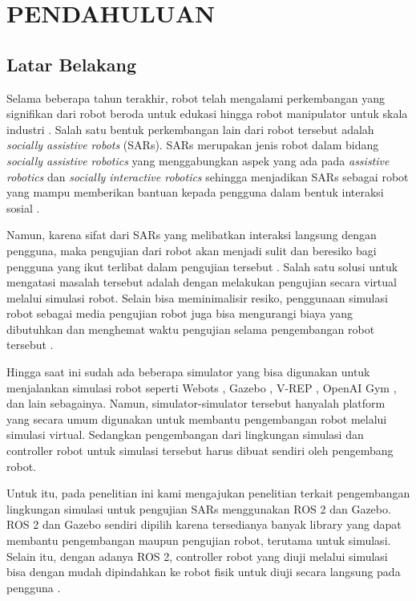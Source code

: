 \section{PENDAHULUAN}

\subsection{Latar Belakang}

Selama beberapa tahun terakhir, robot telah mengalami perkembangan yang signifikan dari robot beroda untuk edukasi \citep{Goncalves2009} hingga robot manipulator untuk skala industri \citep{Blatnicky2020}.
Salah satu bentuk perkembangan lain dari robot tersebut adalah \emph{socially assistive robots} (SARs).
SARs merupakan jenis robot dalam bidang \emph{socially assistive robotics} yang menggabungkan aspek yang ada pada \emph{assistive robotics} dan \emph{socially interactive robotics} sehingga menjadikan SARs sebagai robot yang mampu memberikan bantuan kepada pengguna dalam bentuk interaksi sosial \citep{Seifer2005}.

Namun, karena sifat dari SARs yang melibatkan interaksi langsung dengan pengguna, maka pengujian dari robot akan menjadi sulit dan beresiko bagi pengguna yang ikut terlibat dalam pengujian tersebut \citep{Erickson2020}.
Salah satu solusi untuk mengatasi masalah tersebut adalah dengan melakukan pengujian secara virtual melalui simulasi robot.
Selain bisa meminimalisir resiko, penggunaan simulasi robot sebagai media pengujian robot juga bisa mengurangi biaya yang dibutuhkan dan menghemat waktu pengujian selama pengembangan robot tersebut \citep{Takaya2016}.

Hingga saat ini sudah ada beberapa simulator yang bisa digunakan untuk menjalankan simulasi robot seperti Webots \citep{Michel2004}, Gazebo \citep{Koenig2004}, V-REP \citep{Rohmer2013}, OpenAI Gym \citep{Brockman2016}, dan lain sebagainya.
Namun, simulator-simulator tersebut hanyalah platform yang secara umum digunakan untuk membantu pengembangan robot melalui simulasi virtual.
Sedangkan pengembangan dari lingkungan simulasi dan controller robot untuk simulasi tersebut harus dibuat sendiri oleh pengembang robot.

Untuk itu, pada penelitian ini kami mengajukan penelitian terkait pengembangan lingkungan simulasi untuk pengujian SARs menggunakan ROS 2 dan Gazebo.
ROS 2 dan Gazebo sendiri dipilih karena tersedianya banyak library yang dapat membantu pengembangan maupun pengujian robot, terutama untuk simulasi.
Selain itu, dengan adanya ROS 2, controller robot yang diuji melalui simulasi bisa dengan mudah dipindahkan ke robot fisik untuk diuji secara langsung pada pengguna \citep{Takaya2016}.

